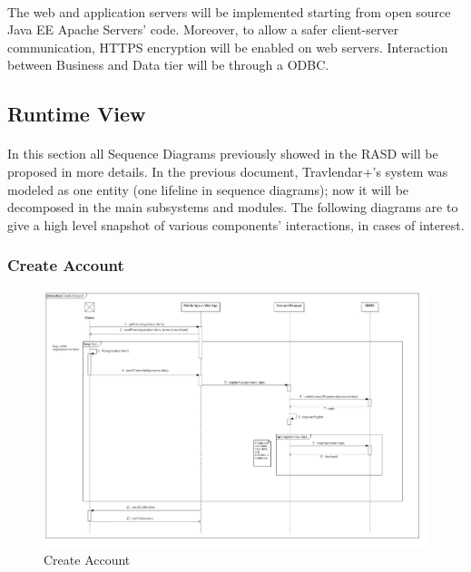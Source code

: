 \documentclass{article}
\begin{document}
			\paragraph{}The web and application servers will be implemented starting from open source Java EE Apache Servers’ code. Moreover, to allow a safer client-server communication, HTTPS encryption will be enabled on web servers. Interaction between Business and Data tier will be through a ODBC.
		\subsection{Runtime View}
			\paragraph{}In this section all Sequence Diagrams previously showed in the RASD will be proposed in more details. In the previous document,  Travlendar+’s system was modeled as one entity (one lifeline in sequence diagrams); now it will be decomposed in the main subsystems and modules. The following diagrams are to give a high level snapshot of various components’ interactions, in cases of interest.  
				\subsubsection{Create Account}
				\begin{figure}[H]
				\includegraphics[width=\linewidth]{Images/Sequence_Diagrams/1-Create_Account_DD.jpg}
				\caption{Create Account}
				\label{fig:SD1}
				\end{figure}
\end{document}
